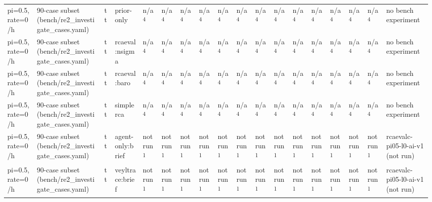 \begin{table}[t]
\begin{tabular}{llllllllllllllllll}
pi=0.5, rate=0/h & 90-case subset (bench/re2\_investigate\_cases.yaml) & tt & prior-only & n/a\textsuperscript{4} & n/a\textsuperscript{4} & n/a\textsuperscript{4} & n/a\textsuperscript{4} & n/a\textsuperscript{4} & n/a\textsuperscript{4} & n/a\textsuperscript{4} & n/a\textsuperscript{4} & n/a\textsuperscript{4} & n/a\textsuperscript{4} & n/a\textsuperscript{4} & n/a\textsuperscript{4} & n/a\textsuperscript{4} & no bench experiment \\
pi=0.5, rate=0/h & 90-case subset (bench/re2\_investigate\_cases.yaml) & tt & rcaeval:nsigma & n/a\textsuperscript{4} & n/a\textsuperscript{4} & n/a\textsuperscript{4} & n/a\textsuperscript{4} & n/a\textsuperscript{4} & n/a\textsuperscript{4} & n/a\textsuperscript{4} & n/a\textsuperscript{4} & n/a\textsuperscript{4} & n/a\textsuperscript{4} & n/a\textsuperscript{4} & n/a\textsuperscript{4} & n/a\textsuperscript{4} & no bench experiment \\
pi=0.5, rate=0/h & 90-case subset (bench/re2\_investigate\_cases.yaml) & tt & rcaeval:baro & n/a\textsuperscript{4} & n/a\textsuperscript{4} & n/a\textsuperscript{4} & n/a\textsuperscript{4} & n/a\textsuperscript{4} & n/a\textsuperscript{4} & n/a\textsuperscript{4} & n/a\textsuperscript{4} & n/a\textsuperscript{4} & n/a\textsuperscript{4} & n/a\textsuperscript{4} & n/a\textsuperscript{4} & n/a\textsuperscript{4} & no bench experiment \\
pi=0.5, rate=0/h & 90-case subset (bench/re2\_investigate\_cases.yaml) & tt & simplerca & n/a\textsuperscript{4} & n/a\textsuperscript{4} & n/a\textsuperscript{4} & n/a\textsuperscript{4} & n/a\textsuperscript{4} & n/a\textsuperscript{4} & n/a\textsuperscript{4} & n/a\textsuperscript{4} & n/a\textsuperscript{4} & n/a\textsuperscript{4} & n/a\textsuperscript{4} & n/a\textsuperscript{4} & n/a\textsuperscript{4} & no bench experiment \\
pi=0.5, rate=0/h & 90-case subset (bench/re2\_investigate\_cases.yaml) & tt & agent-only:brief & not run\textsuperscript{1} & not run\textsuperscript{1} & not run\textsuperscript{1} & not run\textsuperscript{1} & not run\textsuperscript{1} & not run\textsuperscript{1} & not run\textsuperscript{1} & not run\textsuperscript{1} & not run\textsuperscript{1} & not run\textsuperscript{1} & not run\textsuperscript{1} & not run\textsuperscript{1} & not run\textsuperscript{1} & rcaevalc-pi05-l0-ai-v1 (not run) \\
pi=0.5, rate=0/h & 90-case subset (bench/re2\_investigate\_cases.yaml) & tt & veyltrace:brief & not run\textsuperscript{1} & not run\textsuperscript{1} & not run\textsuperscript{1} & not run\textsuperscript{1} & not run\textsuperscript{1} & not run\textsuperscript{1} & not run\textsuperscript{1} & not run\textsuperscript{1} & not run\textsuperscript{1} & not run\textsuperscript{1} & not run\textsuperscript{1} & not run\textsuperscript{1} & not run\textsuperscript{1} & rcaevalc-pi05-l0-ai-v1 (not run) \\

\end{tabular}
\end{table}
